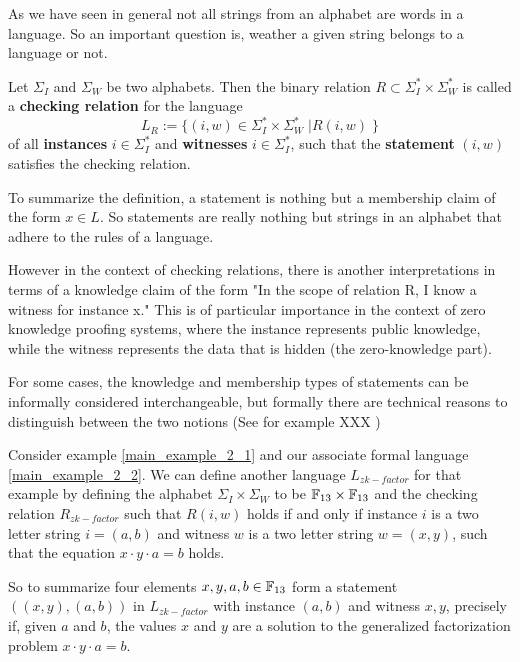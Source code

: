 \begin{example}
\end{example}

\begin{example}[Compiler]
\end{example}



As we have seen in general not all strings from an alphabet are words in a language. So an important question is, weather a given string belongs to a language or not. 

\begin{definition} Let $\Sigma_I$ and $\Sigma_W$ be two alphabets. Then the binary relation $R\subset \Sigma_I^* \times \Sigma_W^*$ is called a \textbf{checking relation} for the language 
$$
L_R := \{(i,w) \in \Sigma_I^* \times \Sigma_W^*\;| R(i,w)\; \}
$$ 
of all \textbf{instances} $i\in \Sigma_I^*$ and \textbf{witnesses} $i\in \Sigma_I^*$, such that the \textbf{statement} $(i,w)$ satisfies the checking relation.
\end{definition}
\begin{remark}
To summarize the definition, a statement is nothing but a membership claim of the form $x\in L$. So statements are really nothing but strings in an alphabet that adhere to the rules of a language. 

However in the context of checking relations, there is another interpretations in terms of a knowledge claim of the form "In the scope of relation R, I know a witness for instance x." This is of particular importance in the context of zero knowledge proofing systems, where the instance represents public knowledge, while the witness represents the data that is hidden (the zero-knowledge part). 

For some cases, the knowledge and membership types of statements can be informally considered interchangeable, but formally there are technical reasons to distinguish between the two notions (See for example XXX
) 
\end{remark}
\begin{example}
\label{main_example_2_3}
Consider example \ref{main_example_2_1} and our associate formal language \ref{main_example_2_2}. We can define another language $L_{zk-factor}$ for that example by defining the alphabet $\Sigma_I \times \Sigma_W$ to be $\mathbb{F}_{13} \times \mathbb{F}_{13}$ and the checking relation $R_{zk-factor}$ such that
$R(i,w)$ holds if and only if instance $i$ is a two letter string $i=(a,b)$ and witness $w$ is a two letter string $w=(x,y)$, such that the equation $x\cdot y \cdot a = b$ holds. 

So to summarize four elements $x,y,a,b\in \mathbb{F}_{13}$ form a statement 
$((x,y),(a,b))$ in $L_{zk-factor}$ with instance $(a,b)$ and witness $x,y$, precisely if, given $a$ and $b$, the values $x$ and $y$ are a solution to the generalized factorization problem $x\cdot y \cdot a = b$.
\end{example}


